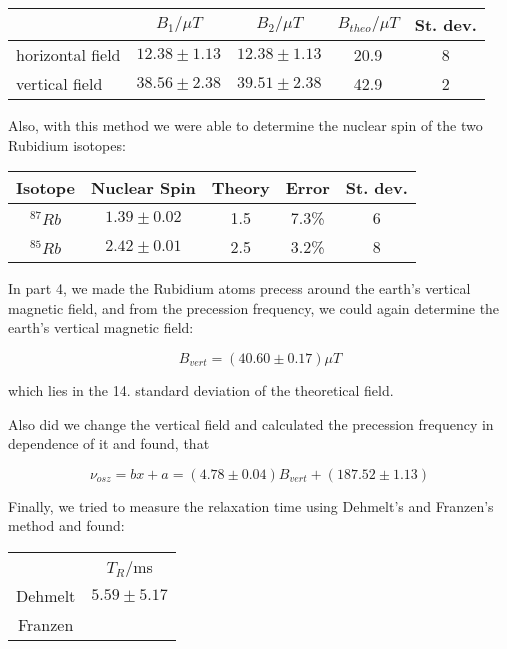 \begin{center}
\begin{tabular}[H]{| l | c c c c |} \hline
 & $B_1 /\mu T$ & $B_2 /\mu T$ & $B_{theo} /\mu T$ & St. dev.\\ \hline
horizontal field & $12.38 \pm 1.13$ & $12.38 \pm 1.13$ &  20.9 & 8 \\
vertical field & $38.56 \pm 2.38$ & $39.51 \pm 2.38$ & 42.9 & 2 \\ \hline
\end{tabular}
\end{center}

Also, with this method we were able to determine the nuclear spin of the two Rubidium isotopes:

\begin{center}
\begin{tabular}[H]{| c | c c c c |} \hline
Isotope & Nuclear Spin & Theory & Error & St. dev. \\ \hline
 $^{87}Rb$ & $1.39 \pm 0.02$ & 1.5 & 7.3\% & 6 \\
 $^{85}Rb$ & $2.42 \pm 0.01$ & 2.5 & 3.2\% & 8\\  \hline
\end{tabular}
\end{center}

In part 4, we made the Rubidium atoms precess around the earth's vertical magnetic field, and from the precession frequency, we could again determine the earth's vertical magnetic field:

$$B_{vert} = (40.60\pm0.17) \mu T $$

which lies in the 14. standard deviation of the theoretical field.

Also did we change the vertical field and calculated the precession frequency in dependence of it and found, that 

$$\nu_{osz} = bx + a = (4.78\pm0.04)B_{vert} + (187.52\pm1.13)$$

Finally, we tried to measure the relaxation time using Dehmelt's and Franzen's method and found:

\begin{center}
\begin{tabular}[H]{c c}
		& $T_R$/ms \\
Dehmelt 	& $5.59 \pm 5.17$ \\
Franzen 	& \\
\end{tabular}
\end{center}







